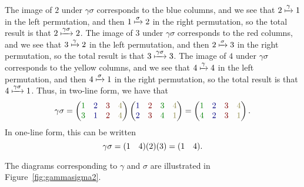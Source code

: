 \begin{example}
\[    \]
    The image of $2$ under $\gamma\sigma$ corresponds to the blue columns, and we see that $2 \xmapsto{\gamma} 1$ in the left permutation, and then $1 \xmapsto{\sigma} 2$ in the right permutation, so the total result is that $2 \xmapsto{\gamma\sigma} 2$. The image of $3$ under $\gamma\sigma$ corresponds to the red columns, and we see that $3 \xmapsto{\gamma} 2$ in the left permutation, and then $2 \xmapsto{\sigma} 3$ in the right permutation, so the total result is that $3 \xmapsto{\gamma\sigma} 3$. The image of $4$ under $\gamma\sigma$ corresponds to the yellow columns, and we see that $4 \xmapsto{\gamma} 4$ in the left permutation, and then $4 \xmapsto{\sigma} 1$ in the right permutation, so the total result is that $4 \xmapsto{\gamma\sigma} 1$. Thus, in two-line form, we have that
    \[
    \gamma\sigma = \begin{pmatrix}
        \textcolor{green!50!black}{1} & \textcolor{blue!50!black}{2} & \textcolor{red!50!black}{3} & \textcolor{yellow!50!black}{4} \\
        \textcolor{green!50!black}{3} & \textcolor{blue!50!black}{1} & \textcolor{red!50!black}{2} & \textcolor{yellow!50!black}{4} \\
    \end{pmatrix}\begin{pmatrix}
        \textcolor{blue!50!black}{1} & \textcolor{red!50!black}{2} & \textcolor{green!50!black}{3} & \textcolor{yellow!50!black}{4} \\
        \textcolor{blue!50!black}{2} & \textcolor{red!50!black}{3} & \textcolor{green!50!black}{4} & \textcolor{yellow!50!black}{1} \\
    \end{pmatrix} = \begin{pmatrix}
        \textcolor{green!50!black}{1} & \textcolor{blue!50!black}{2} & \textcolor{red!50!black}{3} & \textcolor{yellow!50!black}{4} \\
        \textcolor{green!50!black}{4} & \textcolor{blue!50!black}{2} & \textcolor{red!50!black}{3} & \textcolor{yellow!50!black}{1} \\
    \end{pmatrix}.
    \]
    In one-line form, this can be written
    \[
    \gamma\sigma = (1 \quad 4)(2)(3) = (1 \quad 4).
    \]

     The diagrams corresponding to $\gamma$ and $\sigma$ are illustrated in Figure~\ref{fig:gammasigma2}.

    \begin{figure}[h]
        \centering
\end{figure}
\end{example}
